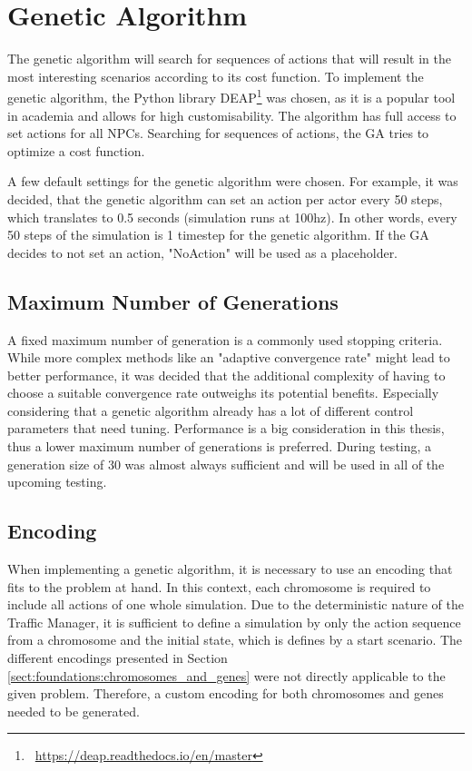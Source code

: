 \section{Genetic Algorithm}
The genetic algorithm will search for sequences of actions that will result in the most interesting scenarios according to its cost function. To implement the genetic algorithm, the Python library DEAP\footnote{~\url{https://deap.readthedocs.io/en/master}} was chosen, as it is a popular tool in academia and allows for high customisability. The algorithm has full access to set actions for all NPCs. Searching for sequences of actions, the GA tries to optimize a cost function.

A few default settings for the genetic algorithm were chosen. For example, it was decided, that the genetic algorithm can set an action per actor every 50 steps, which translates to 0.5 seconds (simulation runs at 100hz). In other words, every 50 steps of the simulation is 1 timestep for the genetic algorithm. If the GA decides to not set an action, "NoAction" will be used as a placeholder.

\subsection{Maximum Number of Generations}
A fixed maximum number of generation is a commonly used stopping criteria. While more complex methods like an "adaptive convergence rate" might lead to better performance, it was decided that the additional complexity of having to choose a suitable convergence rate outweighs its potential benefits. Especially considering that a genetic algorithm already has a lot of different control parameters that need tuning. Performance is a big consideration in this thesis, thus a lower maximum number of generations is preferred. During testing, a generation size of 30 was almost always sufficient and will be used in all of the upcoming testing.

\subsection{Encoding}
When implementing a genetic algorithm, it is necessary to use an encoding that fits to the problem at hand. In this context, each chromosome is required to include all actions of one whole simulation. Due to the deterministic nature of the Traffic Manager, it is sufficient to define a simulation by only the action sequence from a chromosome and the initial state, which is defines by a start scenario. The different encodings presented in Section \ref{sect:foundations:chromosomes_and_genes} were not directly applicable to the given problem. Therefore, a custom encoding for both chromosomes and genes needed to be generated.

